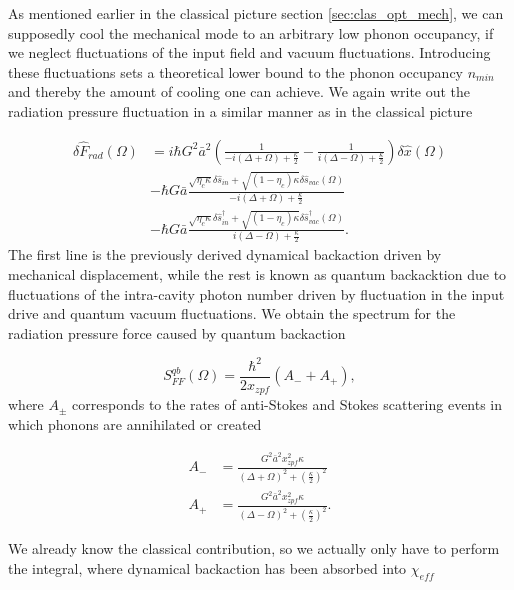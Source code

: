 As mentioned earlier in the classical picture section \ref{sec:clas_opt_mech}, we can supposedly cool the mechanical mode to  an arbitrary low phonon occupancy, if we neglect fluctuations of the input field and vacuum fluctuations. Introducing these fluctuations sets a theoretical lower bound to the phonon occupancy $n_{min}$ and thereby the amount of cooling one can achieve. We again write out the radiation pressure fluctuation in a similar manner as in the classical picture

\begin{equation}
\begin{split}
\delta\hat{F}_{rad}(\Omega) & = i\hbar G^2\bar{a}^2\left( \frac{1}{-i(\Delta + \Omega) + \frac{\kappa}{2}} - \frac{1}{i(\Delta - \Omega) + \frac{\kappa}{2}} \right)\delta\hat{x}(\Omega) \\ 
 & - \hbar G\bar{a}\frac{ \sqrt{\eta_c\kappa}\delta\hat{s}_{in} + \sqrt{(1 - \eta_c)\kappa}\delta\hat{s}_{vac}(\Omega)}{-i(\Delta + \Omega) + \frac{\kappa}{2}} \\
 & - \hbar G\bar{a}\frac{\sqrt{\eta_c\kappa}\delta\hat{s}_{in}^\dagger + \sqrt{(1 - \eta_c)\kappa}\delta\hat{s}_{vac}^\dagger(\Omega)}{i(\Delta - \Omega) + \frac{\kappa}{2}}.
\end{split}
\end{equation}
\noindent
The first line is the previously derived dynamical backaction driven by mechanical displacement, while the rest is known as quantum backacktion due to fluctuations of the intra-cavity photon number driven by fluctuation in the input drive and quantum vacuum fluctuations. We obtain the spectrum for the radiation pressure force caused by quantum backaction

\begin{equation}
S_{FF}^{qb}(\Omega) = \frac{\hbar^2}{2x_{zpf}}\left( A_- + A_+ \right),
\end{equation}
\noindent
where $A_{\pm}$ corresponds to the rates of anti-Stokes and Stokes scattering events in which phonons are annihilated or created

\begin{align}
A_- & = \frac{G^2\bar{a}^2x_{zpf}^2\kappa}{(\Delta + \Omega)^2 + \left(\frac{\kappa}{2}\right)^2} \\
A_+ & = \frac{G^2\bar{a}^2x_{zpf}^2\kappa}{(\Delta - \Omega)^2 + \left(\frac{\kappa}{2}\right)^2}.
\end{align}

We already know the classical contribution, so we actually only have to perform the integral, where dynamical backaction has been absorbed into $\chi_{eff}$

